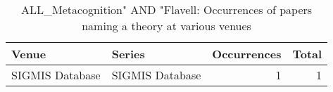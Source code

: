 \begin{table*}[t]
\begin{tabular}{llrr}
Venue & Series & Occurrences & Total\\\hline
\multirow{1}{*}{SIGMIS Database} & SIGMIS Database & 1 & \multirow{1}{*}{1}\\
\end{tabular}
\caption{ALL\_Metacognition" AND "Flavell: Occurrences of papers naming a theory at various venues}
\end{table*}